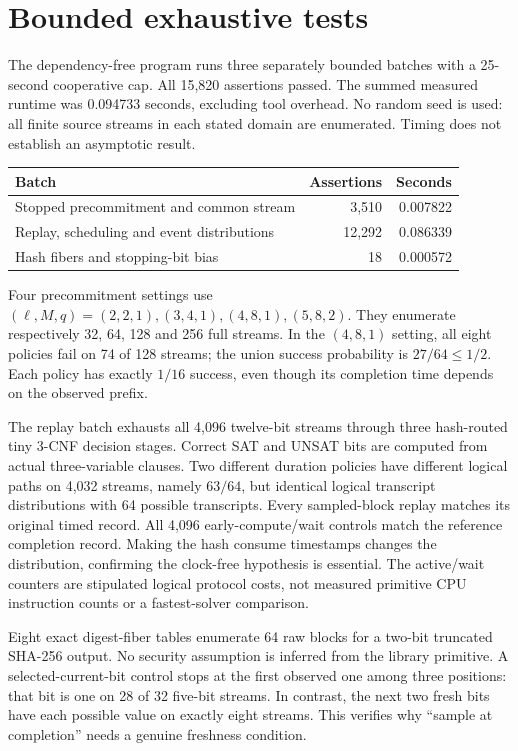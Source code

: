 \documentclass[11pt]{article}
\begin{document}
\section{Bounded exhaustive tests}
The dependency-free program
 runs three separately bounded
batches with a 25-second cooperative cap. All 15,820 assertions passed. The
summed measured runtime was 0.094733 seconds, excluding tool overhead.
No random seed is used: all finite source streams in each stated domain are
enumerated. Timing does not establish an asymptotic result.
\begin{center}
\begin{tabular}{lrr}\toprule
Batch & Assertions & Seconds\\\midrule
Stopped precommitment and common stream & 3,510 & 0.007822\\
Replay, scheduling and event distributions & 12,292 & 0.086339\\
Hash fibers and stopping-bit bias & 18 & 0.000572\\\bottomrule
\end{tabular}
\end{center}
Four precommitment settings use $(\ell,M,q)=(2,2,1),(3,4,1),(4,8,1),(5,8,2)$.
They enumerate respectively 32, 64, 128 and 256 full streams. In the
$(4,8,1)$ setting, all eight policies fail on 74 of 128 streams; the union
success probability is $27/64\le1/2$. Each policy has exactly $1/16$ success,
even though its completion time depends on the observed prefix.

The replay batch exhausts all 4,096 twelve-bit streams through three
hash-routed tiny 3-CNF decision stages. Correct SAT and UNSAT bits are computed
from actual three-variable clauses. Two different duration policies have
different logical paths on 4,032 streams, namely $63/64$, but identical logical
transcript distributions with 64 possible transcripts. Every sampled-block
replay matches its original timed record. All 4,096 early-compute/wait controls
match the reference completion record. Making the hash consume timestamps
changes the distribution, confirming the clock-free hypothesis is essential.
The active/wait counters are stipulated logical protocol costs, not measured
primitive CPU instruction counts or a fastest-solver comparison.

Eight exact digest-fiber tables enumerate 64 raw blocks for a two-bit truncated
SHA-256 output. No security assumption is inferred from the library primitive.
A selected-current-bit control stops at the first observed one among three
positions: that bit is one on 28 of 32 five-bit streams. In contrast, the next
two fresh bits have each possible value on exactly eight streams. This verifies
why ``sample at completion'' needs a genuine freshness condition.
\end{document}
